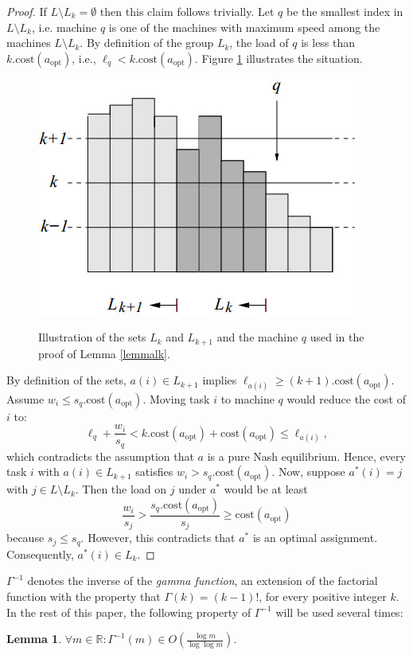 \documentclass[a4paper,11pt]{article}
\newtheorem{lemma}[theorem]{Lemma}
\newcommand{\R}{{\mathbb R}}
\newcommand{\cost}{\text{cost}}
\newcommand{\opt}{\text{opt}}
\newcommand{\copt}{\cost(a_{\opt})}
\begin{document}
\begin{proof}
If $L\setminus L_k = \emptyset$ then this claim follows trivially. Let $q$ be the smallest index in $L\setminus L_k$, i.e. machine $q$ is one of the machines with maximum speed among the machines $L\setminus L_k$. By definition of the group $L_k$, the load of $q$ is less than $k.\copt$, i.e., $\ell_q < k.\copt$. Figure \ref{lk2} illustrates the situation. \\
\begin{figure}
  \centering
  \includegraphics[scale=0.5]{lk2.jpg}\\
  \caption{Illustration of the sets $L_{k}$ and $L_{k+1}$ and the machine $q$ used in the proof of Lemma \ref{lemmalk}.}
  \label{lk2}
\end{figure}
By definition of the sets, $a(i) \in L_{k+1}$ implies $\ell_{a(i)} \geq (k+1).\copt$. Assume $w_i \leq s_q.\copt$. Moving task $i$ to machine $q$ would reduce the cost of $i$ to:
$$\ell_q + \frac{w_i}{s_q} < k.\copt + \copt \leq \ell_{a(i)},$$
which contradicts the assumption that $a$ is a pure Nash equilibrium. Hence, every task $i$ with $a(i) \in L_{k+1}$  satisfies $w_i > s_q.\copt$. Now, suppose $a^*(i) = j$ with $j \in L\setminus L_k$. Then the load on $j$ under $a^*$ would be at least
$$\frac{w_i}{s_j} > \frac{s_q.\copt}{s_j}\geq\copt$$
because $s_j \leq s_q$. However, this contradicts that $a^*$ is an optimal assignment. Consequently, $a^*(i) \in L_k$.
\end{proof}
$\Gamma^{-1}$ denotes the inverse of the \emph{gamma function}, an extension of the factorial function with the property that $\Gamma(k) = (k-1)!$, for every positive integer $k$. In the rest of this paper, the following property of $\Gamma^{-1}$ will be used several times:
\begin{lemma}\label{gamma}
$\forall m \in \R: \Gamma^{-1}(m) \in O\left(\frac{\log m}{\log \log m}\right)$.
\end{lemma}
\end{document}
